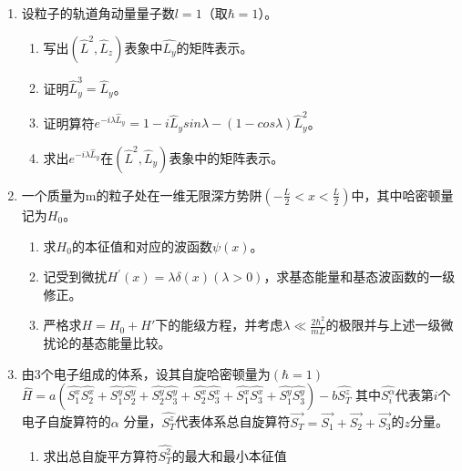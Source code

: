 \begin{enumerate}
\item 
设粒子的轨道角动量量子数\(l=1\)（取\(\hbar=1\)）。
	\begin{enumerate}
		\item
写出\((\hat{L}^{2},\hat{L}_z)\)表象中\(\hat{L_y}\)的矩阵表示。
	
	\item 
	证明\(\hat{L}_{y}^{3}=\hat{L}_{y}\)。
	
	\item 
	证明算符\(e^{-i\lambda\hat{L}_{y}}=1-i\hat{L}_{y}sin\lambda-(1-cos\lambda)\hat{L}_{y}^2\)。
	
	\item 
	求出\(e^{-i\lambda\hat{L}_{y}}\)在\((\hat{L}^{2},\hat{L}_y)\)表象中的矩阵表示。
	\end{enumerate}
\banswer{
	
}


\newpage	
	\item 
	一个质量为m的粒子处在一维无限深方势阱\(\left(-\frac{L}{2}<x<\frac{L}{2}\right)\)中，其中哈密顿量记为\(H_0\)。
	\begin{enumerate}
		\item
求\(H_0\)的本征值和对应的波函数\(\psi(x)\)。
	
	\item 
	记受到微扰\(H^{\prime}(x)=\lambda \delta(x)(\lambda>0)\)，求基态能量和基态波函数的一级修正。
	
	\item 
	严格求\(H=H_{0}+H'\)下的能级方程，并考虑\(\lambda \ll \frac{2 \hbar^{2}}{m L}\)的极限并与上述一级微扰论的基态能量比较。
\end{enumerate}	

\banswer{
	
}


\item 
由$ 3 $个电子组成的体系，设其自旋哈密顿量为\((\hbar=1)\)
$ \hat{H}=a(\hat{S_1^x}\hat{S_2^x}+\hat{S_1^y}\hat{S_2^y}+\hat{S_2^y}\hat{S_3^y}+\hat{S_2^x}\hat{S_3^x}+\hat{S_1^x}\hat{S_3^x}+\hat{S_1^y}\hat{S_3^y})-b\hat{S_T^z} $
其中\(\hat{S_i^\alpha}\)代表第$ i $个电子自旋算符的$\alpha $
分量，$\hat{S_T^z}$代表体系总自旋算符$\vec{S_T}=\vec{S_1}+\vec{S_2} + \vec{S_3}$的$ z $分量。
\begin{enumerate}
	\item
求出总自旋平方算符\(\hat{S_T^2}\)的最大和最小本征值
	

\end{enumerate}
\end{enumerate}
